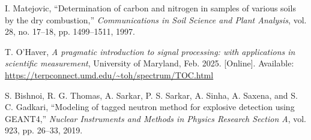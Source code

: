 \documentclass[xcolor=dvipsnames,envcountsect]{beamer}
\begin{document}
\begin{frame}[allowframebreaks]
\begin{thebibliography}{11}
    I. Matejovic, ``Determination of carbon and nitrogen in samples of various soils by the dry combustion,'' \textit{Communications in Soil Science and Plant Analysis}, vol. 28, no. 17--18, pp. 1499--1511, 1997.
    
    T. O'Haver, \textit{A pragmatic introduction to signal processing: with applications in scientific measurement}, University of Maryland, Feb. 2025. [Online]. Available: \url{https://terpconnect.umd.edu/~toh/spectrum/TOC.html}
    
    S. Bishnoi, R. G. Thomas, A. Sarkar, P. S. Sarkar, A. Sinha, A. Saxena, and S. C. Gadkari, ``Modeling of tagged neutron method for explosive detection using GEANT4,'' \textit{Nuclear Instruments and Methods in Physics Research Section A}, vol. 923, pp. 26--33, 2019.
    
    \end{thebibliography}
\end{frame}
\end{document}
